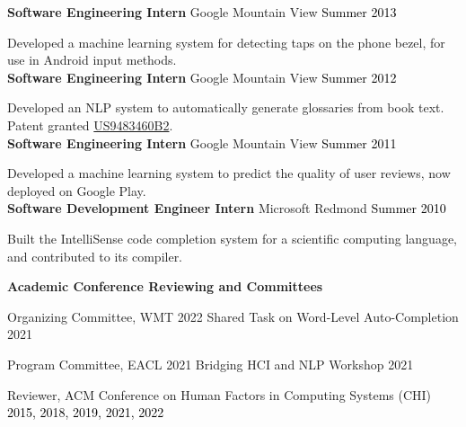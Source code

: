 \documentclass[10pt,A4]{article}
\newcommand{\cvsection}[1]
{
	\begin{center}
		\large\textcolor{sectcol}{\textbf{#1}}
	\end{center}
}
\newcommand{\cvevtone}[4]
{

	\textbf{#2} \hspace{1mm} \textcolor{bgcol}{#3} \hfill \vspace{2.5pt}\textcolor{black}{#1}

\vspace{-8pt}
\vspace{6pt}

  #4\\[3pt]

}
\begin{document}
\cvevtone{Summer 2013}{Software Engineering Intern}{\textcolor{sectcol}{Google} \hspace{1mm} Mountain View}{Developed a machine learning system for detecting taps on the phone bezel, for use in Android input methods.} %

\cvevtone{Summer 2012}{Software Engineering Intern}{\textcolor{sectcol}{Google} \hspace{1mm} Mountain View}{Developed an NLP system to automatically generate glossaries from book text. Patent granted \href{https://patents.google.com/patent/US9483460B2}{US9483460B2}.} %

\cvevtone{Summer 2011}{Software Engineering Intern}{\textcolor{sectcol}{Google} \hspace{1mm} Mountain View}{Developed a machine learning system to predict the quality of user reviews, now deployed on Google Play.} %

\cvevtone{Summer 2010}{Software Development Engineer Intern}{\textcolor{sectcol}{Microsoft} \hspace{1mm} Redmond}{Built the IntelliSense code completion system for a scientific computing language, and contributed to its compiler.} %


\vspace{-4mm}



\vspace{2mm}







\cvsection{Academic Conference Reviewing and Committees}

Organizing Committee, WMT 2022 Shared Task on Word-Level Auto-Completion \hfill 2021

Program Committee, EACL 2021 Bridging HCI and NLP Workshop \hfill 2021

Reviewer, ACM Conference on Human Factors in Computing Systems (CHI) \hfill \textcolor{black}{2015, 2018, 2019, 2021, 2022}
\end{document}
